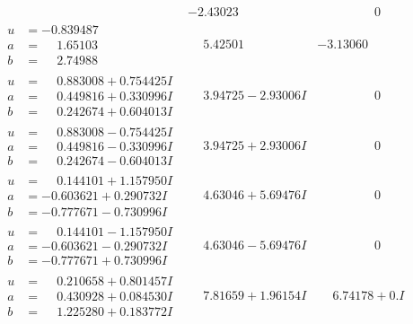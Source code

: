 \documentclass[1p]{elsarticle_modified}
\theoremstyle{definition}
\begin{document}
$$\begin{array}{c|c|c}
 & -2.43023\phantom{ +0.000000I} & \phantom{-0.000000 } 0 \\ \hline\begin{aligned}
u &= -0.839487\phantom{ +0.000000I} \\
a &= \phantom{-}1.65103\phantom{ +0.000000I} \\
b &= \phantom{-}2.74988\phantom{ +0.000000I}\end{aligned}
 & \phantom{-}5.42501\phantom{ +0.000000I} & -3.13060\phantom{ +0.000000I} \\ \hline\begin{aligned}
u &= \phantom{-}0.883008 + 0.754425 I \\
a &= \phantom{-}0.449816 + 0.330996 I \\
b &= \phantom{-}0.242674 + 0.604013 I\end{aligned}
 & \phantom{-}3.94725 - 2.93006 I & \phantom{-0.000000 } 0 \\ \hline\begin{aligned}
u &= \phantom{-}0.883008 - 0.754425 I \\
a &= \phantom{-}0.449816 - 0.330996 I \\
b &= \phantom{-}0.242674 - 0.604013 I\end{aligned}
 & \phantom{-}3.94725 + 2.93006 I & \phantom{-0.000000 } 0 \\ \hline\begin{aligned}
u &= \phantom{-}0.144101 + 1.157950 I \\
a &= -0.603621 + 0.290732 I \\
b &= -0.777671 - 0.730996 I\end{aligned}
 & \phantom{-}4.63046 + 5.69476 I & \phantom{-0.000000 } 0 \\ \hline\begin{aligned}
u &= \phantom{-}0.144101 - 1.157950 I \\
a &= -0.603621 - 0.290732 I \\
b &= -0.777671 + 0.730996 I\end{aligned}
 & \phantom{-}4.63046 - 5.69476 I & \phantom{-0.000000 } 0 \\ \hline\begin{aligned}
u &= \phantom{-}0.210658 + 0.801457 I \\
a &= \phantom{-}0.430928 + 0.084530 I \\
b &= \phantom{-}1.225280 + 0.183772 I\end{aligned}
 & \phantom{-}7.81659 + 1.96154 I & \phantom{-}6.74178 + 0. I\phantom{ +0.000000I} \\ \hline\begin{aligned}

\end{aligned}
\end{array}$$
\end{document}
